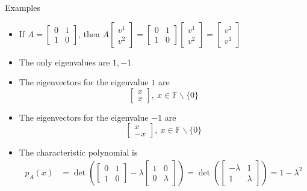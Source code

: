 \documentclass[usenames,dvipsnames,10pt]{beamer}
\newcommand\F{\mathbb{F}}
\begin{document}
\begin{frame}
  {Examples}

  \begin{itemize}
  \item If $A = \begin{bmatrix} 0 & 1 \\ 1 & 0\end{bmatrix}$, then
    $A\begin{bmatrix} v^1\\v^2\end{bmatrix} =\begin{bmatrix} 0 & 1 \\ 1 & 0\end{bmatrix}\begin{bmatrix} v^1\\v^2\end{bmatrix} = \begin{bmatrix} v^2 \\ v^1 \end{bmatrix}$
  \item The only eigenvalues are $1, -1$
  \item The eigenvectors for the eigenvalue $1$ are
    \[ \begin{bmatrix} x \\ x \end{bmatrix},\ x \in \F\backslash\{0\} \]
  \item The eigenvectors for the eigenvalue $-1$ are
    \[ \begin{bmatrix} x \\ -x \end{bmatrix},\ x \in \F\backslash\{0\} \]
  \item The characteristic polynomial is
    \begin{align*}
      p_A(x)
      &= \det\left(\begin{bmatrix} 0 & 1 \\ 1 & 0\end{bmatrix}-\lambda\begin{bmatrix} 1 & 0 \\ 0 & \lambda\end{bmatrix}\right)
        = \det\left(\begin{bmatrix} -\lambda & 1 \\ 1 & \lambda\end{bmatrix}\right)
        = 1-\lambda^2
    \end{align*}
  \end{itemize}
\end{frame}
\end{document}
